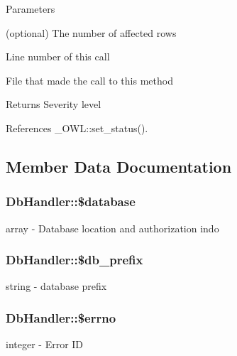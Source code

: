 \begin{DoxyParams}{Parameters}
\item[\mbox{\tt[out]} {\em \$rows}](optional) The number of affected rows \item[\mbox{\tt[in]} {\em \$line}]Line number of this call \item[\mbox{\tt[in]} {\em \$file}]File that made the call to this method \end{DoxyParams}
\begin{DoxyReturn}{Returns}
Severity level 
\end{DoxyReturn}


References \_\-OWL::set\_\-status().



\subsection{Member Data Documentation}
\subsubsection[{\$database}]{\setlength{\rightskip}{0pt plus 5cm}DbHandler::\$database}\label{classDbHandler_afaac5248f9ee59786b48a7b51f318940}
array -\/ Database location and authorization indo 
\subsubsection[{\$db\_\-prefix}]{\setlength{\rightskip}{0pt plus 5cm}DbHandler::\$db\_\-prefix}\label{classDbHandler_a19af96598e7f72673fc5da26ad77731b}
string -\/ database prefix 
\subsubsection[{\$errno}]{\setlength{\rightskip}{0pt plus 5cm}DbHandler::\$errno}\label{classDbHandler_af6e9f493be56617cb533763bb2a0e85a}
integer -\/ Error ID 
